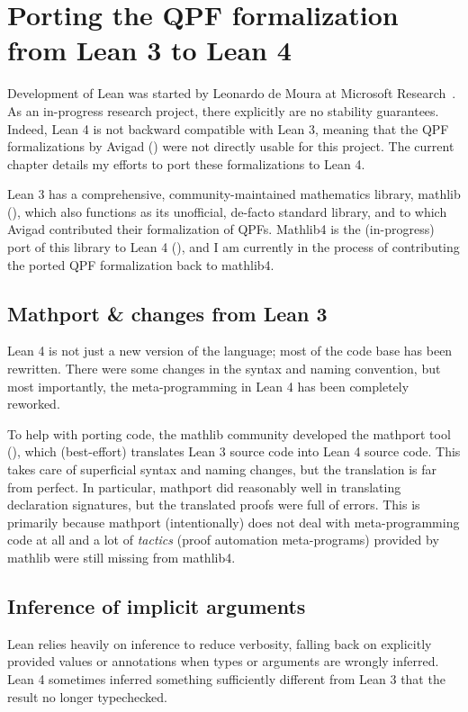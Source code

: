 
\chapter{Porting the QPF formalization from Lean 3 to Lean 4}%
\label{ch:porting}

Development of Lean was started by Leonardo de Moura at Microsoft Research~\cite{demouraLeanTheoremProver2015, avigadTheoremProvingLean}. As an in-progress research project, there explicitly are no stability guarantees. Indeed, Lean 4 is not backward compatible with Lean 3, meaning that the QPF formalizations by Avigad \etal{}
(\cite{avigadDataTypesQuotients2019}) were not directly usable for this project. The current chapter details my efforts to port these formalizations to Lean 4.



Lean 3 has a comprehensive, community-maintained mathematics library, mathlib (\cite{themathlibcommunityLeanMathematicalLibrary2020}), 
which also functions as its unofficial, de-facto standard library, and to which Avigad \etal{} contributed
their formalization of QPFs.
Mathlib4 is the (in-progress) port of this library to Lean 4 (\cite{mathlib4}),
and I am currently in the process of contributing
the ported QPF formalization back to mathlib4.




\section{Mathport \& changes from Lean 3}
Lean 4 is not just a new version of the language; most of the code base has been rewritten.
There were some changes in the syntax and naming convention, but most importantly, 
the meta-programming in Lean 4 has been completely reworked.

To help with porting code, the mathlib community developed the mathport tool (\cite{mathport}), which 
(best-effort) translates Lean 3 source code into Lean 4 source code. This takes care of superficial 
syntax and naming changes, but the translation is far from perfect.
In particular, mathport did reasonably well in translating declaration signatures, 
but the translated proofs were full of errors.
This is primarily because mathport (intentionally) does not deal with meta-programming code at all and a lot
of \emph{tactics} (proof automation meta-programs) provided by mathlib were still missing from mathlib4.


\section{Inference of implicit arguments}
Lean relies heavily on inference to reduce verbosity, falling back on explicitly provided
values or annotations when types or arguments are wrongly inferred.
Lean 4 sometimes inferred something sufficiently different from Lean 3 that the result no longer
typechecked.



